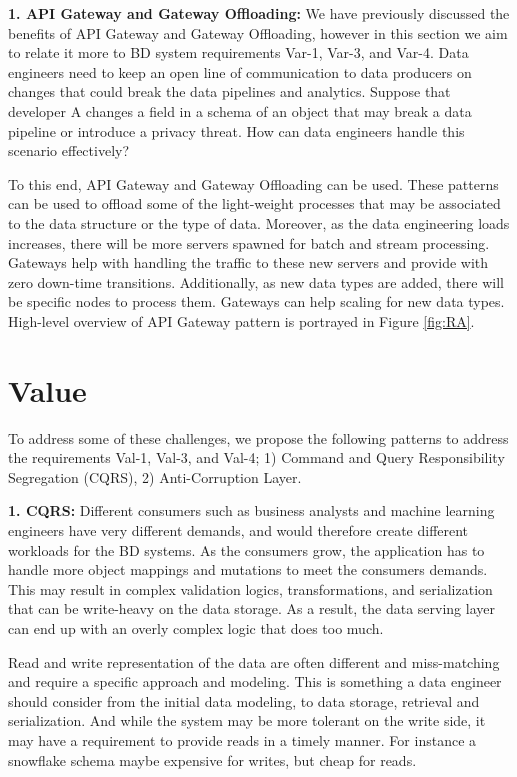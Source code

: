 \documentclass[a4paper,11pt,article,oneside]{memoir}
\begin{document}
\vspace{6px}
\textbf{1. API Gateway and Gateway Offloading:} We have previously discussed the benefits of API Gateway and Gateway Offloading, however in this section we aim to relate it more to BD system requirements Var-1, Var-3, and Var-4. Data engineers need to keep an open line of communication to data producers on changes that could break the data pipelines and analytics. Suppose that developer A changes a field in a schema of an object that may break a data pipeline or introduce a privacy threat. How can data engineers handle this scenario effectively? 

To this end, API Gateway and Gateway Offloading can be used. These patterns can be used to offload some of the light-weight processes that may be associated to the data structure or the type of data. Moreover, as the data engineering loads increases, there will be more servers spawned for batch and stream processing. Gateways help with handling the traffic to these new servers and provide with zero down-time transitions. Additionally, as new data types are added, there will be specific nodes to process them. Gateways can help scaling for new data types. High-level overview of API Gateway pattern is portrayed in Figure \ref{fig:RA}.

\section{Value}

To address some of these challenges, we propose the following patterns to address the requirements Val-1, Val-3, and Val-4; 1) Command and Query Responsibility Segregation (CQRS), 2) Anti-Corruption Layer.

\vspace{6px}
\textbf{1. CQRS:} Different consumers such as business analysts and machine learning engineers have very different demands, and would therefore create different workloads for the BD systems. As the consumers grow, the application has to handle more object mappings and mutations to meet the consumers demands. This may result in complex validation logics, transformations, and serialization that can be write-heavy on the data storage. As a result, the data serving layer can end up with an overly complex logic that does too much. 

Read and write representation of the data are often different and miss-matching and require a specific approach and modeling. This is something a data engineer should consider from the initial data modeling, to data storage, retrieval and serialization. And while the system may be more tolerant on the write side, it may have a requirement to provide reads in a timely manner.  For instance a snowflake schema maybe expensive for writes, but cheap for reads. 
\end{document}
